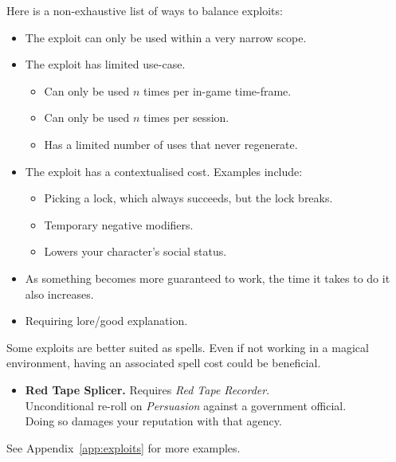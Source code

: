 Here is a non-exhaustive list of ways to balance exploits:
\begin{itemize}
    \item The exploit can only be used within a very narrow scope.
    \item The exploit has limited use-case.
    \begin{itemize}
        \item Can only be used $n$ times per in-game time-frame.
        \item Can only be used $n$ times per session.
        \item Has a limited number of uses that never regenerate.
    \end{itemize}
    \item The exploit has a contextualised cost. Examples include:
    \begin{itemize}
        \item Picking a lock, which always succeeds, but the lock breaks.
        \item Temporary negative modifiers.
        \item Lowers your character's social status.
    \end{itemize}
    \item As something becomes more guaranteed to work, the time it takes to do it also increases.
    \item Requiring lore/good explanation.
\end{itemize}

Some exploits are better suited as spells. 
Even if not working in a magical environment, having an associated spell cost could be beneficial.

\begin{example}
    \begin{itemize}
        \item \textbf{Red Tape Splicer.} Requires \textit{Red Tape Recorder}.\\
        Unconditional re-roll on \textit{Persuasion} against a government official.\\
        Doing so damages your reputation with that agency.
    \end{itemize}
\end{example}
See Appendix~\ref{app:exploits} for more examples.
